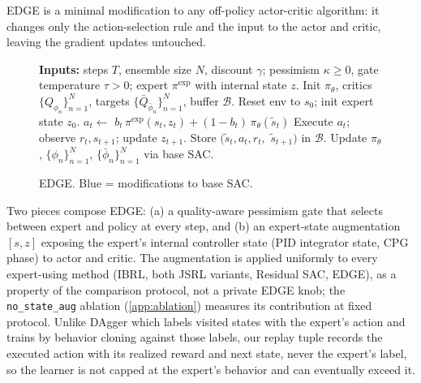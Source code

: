 \documentclass{article}
\begin{document}
EDGE is a minimal modification to any off-policy actor-critic
algorithm: it changes only the action-selection rule and the input
to the actor and critic, leaving the gradient updates untouched.
\begin{figure}
\vspace{-2em}
\begin{minipage}{0.66\textwidth}
\begin{algorithm}[H]
\caption{EDGE. {\color{edgeblue} Blue} = modifications to base SAC.}
\label{alg:edge}
\begin{algorithmic}[1]
\State \textbf{Inputs:} steps $T$, ensemble size $N$, discount $\gamma$;
{\color{edgeblue} pessimism $\kappa\!\geq\!0$, gate temperature $\tau\!>\!0$; expert $\pi^{\mathrm{exp}}$ with internal state $z$.}
\State Init $\pi_\theta$, critics $\{Q_{\phi_n}\}_{n=1}^N$, targets $\{\bar Q_{\bar\phi_n}\}_{n=1}^N$, buffer $\mathcal{B}$.
\State Reset env to $s_0$; {\color{edgeblue} init expert state $z_0$.}
    \State $a_t \leftarrow$ {\color{edgeblue}$b_t\,\pi^{\mathrm{exp}}(s_t, z_t) + (1-b_t)\,$}$\pi_\theta(\tilde s_t)$
    \State Execute $a_t$; observe $r_t, s_{t+1}$; {\color{edgeblue}update $z_{t+1}$.}
    \State Store $(\tilde s_t, a_t, r_t,$ {\color{edgeblue}$\tilde s_{t+1}$}$)$ in $\mathcal{B}$.
    \State Update $\pi_\theta$, $\{\phi_n\}_{n=1}^N$, $\{\bar\phi_n\}_{n=1}^N$ via base SAC.
\EndFor
\end{algorithmic}
\end{algorithm}
\end{minipage}
\end{figure}
Two pieces compose EDGE: (a) a quality-aware pessimism gate
that selects between expert and policy at every step, and (b) an
expert-state augmentation $[s, z]$ exposing the expert's internal
controller state (PID integrator state, CPG phase) to actor and
critic. The augmentation is applied uniformly to every
expert-using method (IBRL, both JSRL variants, Residual SAC,
EDGE), as a property of the comparison protocol, not a private
EDGE knob; the \texttt{no\_state\_aug} ablation
(\cref{app:ablation}) measures its contribution at fixed protocol.
Unlike DAgger \citep{ross2011dagger} which labels visited states
with the expert's action and trains by behavior cloning against those
labels, our replay tuple records the executed action with its realized
reward and next state, never the expert's label, so the learner is
not capped at the expert's behavior and can eventually exceed it.
\end{document}
